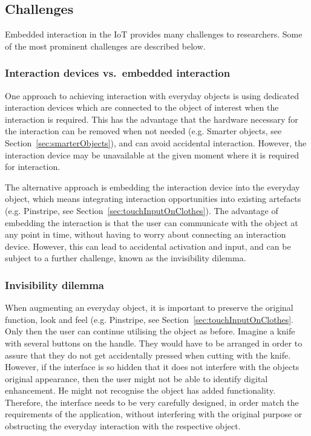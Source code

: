 \subsection{Challenges}
\label{sec:challenges}
Embedded interaction in the IoT provides many challenges to researchers. Some of the most prominent challenges are described below.

\subsubsection{Interaction devices vs.\ embedded interaction}
One approach to achieving interaction with everyday objects is using dedicated interaction devices which are connected to the object of interest when the interaction is required.
This has the advantage that the hardware necessary for the interaction can be removed when not needed (e.g. Smarter objects, see Section~\ref{sec:smarterObjects}), and can avoid accidental interaction. 
However, the interaction device may be unavailable at the given moment where it is required for interaction.

The alternative approach is embedding the interaction device into the everyday object, which means integrating interaction opportunities into existing artefacts (e.g. Pinstripe, see Section~\ref{sec:touchInputOnClothes}). 
The advantage of embedding the interaction is that the user can communicate with the object at any point in time, without having to worry about connecting an interaction device.
However, this can lead to accidental activation and input, and can be subject to a further challenge, known as the invisibility dilemma.

\subsubsection{Invisibility dilemma}
When augmenting an everyday object, it is important to preserve the original function, look and feel (e.g. Pinstripe, see Section~\ref{sec:touchInputOnClothes}.
Only then the user can continue utilising the object as before. Imagine a knife with several buttons on the handle. They would have to be arranged in order to assure that they do not get accidentally pressed when cutting with the knife.
However, if the interface is so hidden that it does not interfere with the objects original appearance, then the user might not be able to identify digital enhancement.
He might not recognise the object has added functionality.
Therefore, the interface needs to be very carefully designed, in order match the requirements of the application, without interfering with the original purpose or obstructing the everyday interaction with the respective object.

